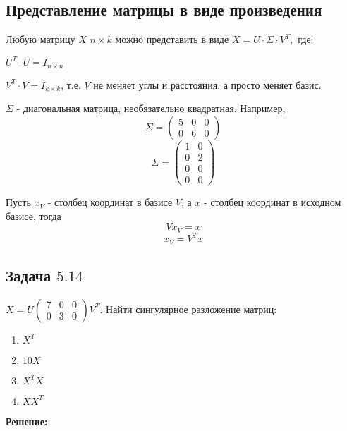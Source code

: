 \documentclass[12pt]{article} %
\theoremstyle{definition} %
\begin{document}
\subsection{Представление матрицы в виде произведения}
Любую матрицу $X$ $n \times k$ можно представить в виде $X = U \cdot \Sigma \cdot V^T,$ где:

$U^T\cdot U = I_{n \times n}$

$V^T\cdot V = I_{k \times k}$,  т.е. $V$ не меняет углы и расстояния. а просто меняет базис.

$\Sigma$ - диагональная матрица, необязательно квадратная. Например, \[\Sigma= \begin{pmatrix}
5 & 0 & 0  \\
0 & 6 & 0 
\end{pmatrix}
\]
\[\Sigma= \begin{pmatrix}
1 & 0  \\
0 & 2  \\
0 & 0  \\
0 & 0  
\end{pmatrix}
\]

Пусть $x_V$ - столбец координат в базисе $V$, а $x$ - столбец координат в исходном базисе, тогда
\[Vx_V=x
\]
\[x_V=V^T x
\]

\subsection{Задача \href{https://github.com/bdemeshev/metrics_pro/raw/master/metrics_pro.pdf}{$5.14$}}
$X= U\begin{pmatrix}
7 & 0 & 0 \\
0 & 3 & 0
\end{pmatrix} V^T$.
Найти сингулярное разложение матриц:

\begin{enumerate}
\item $X^T$
\item $10X$
\item $X^TX$
\item $XX^T$
\end{enumerate}

\textbf{Решение:}
\end{document}

